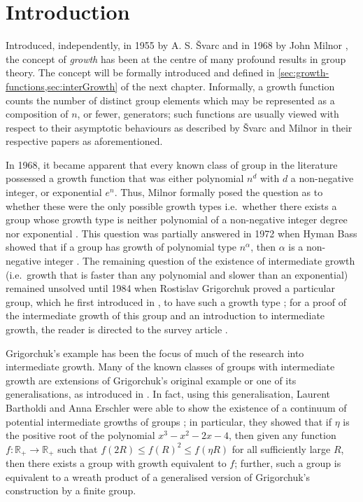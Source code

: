 \chapter{Introduction}

Introduced, independently, in 1955 by A. S. \v{S}varc  %
\cite{SvarcEquivClass} and in 1968 by John Milnor \cite{MilnorEquivClass}, the concept of \emph{growth} has been at the centre of many profound results in group theory.
The concept will be formally introduced and defined in \cref{sec:growth-functions,sec:interGrowth} of the next chapter.
Informally, a growth function counts the number of distinct group elements which may be represented as a composition of $n$, or fewer, generators; such functions are usually viewed with respect to their asymptotic behaviours as described by \v{S}varc and Milnor in their respective papers as aforementioned.

In 1968, it became apparent that every known class of group in the literature possessed a growth function that was either polynomial $n^d$ with $d$ a non-negative integer, or exponential $e^n$.
Thus, Milnor formally posed the question as to whether these were the only possible growth types i.e.\ whether there exists a group whose growth type is neither polynomial of a non-negative integer degree nor exponential \cite{Milnor1968}.
This question was partially answered in 1972 when Hyman Bass showed that if a group has growth of polynomial type $n^\alpha$, then $\alpha$ is a non-negative integer \cite{PolynomialDegree}.
The remaining question of the existence of intermediate growth (i.e.\ growth that is faster than any polynomial and slower than an exponential) remained unsolved until 1984 when Rostislav Grigorchuk proved a particular group, which he first introduced in \cite{GrigFirst}, to have such a growth type \cite{GrigInterm}; for a proof of the intermediate growth of this group and an introduction to intermediate growth, the reader is directed to the survey article \cite{GrigPak}.

Grigorchuk's example  has been the focus of much of the research into intermediate growth.
Many of the known classes of groups with intermediate growth are extensions of Grigorchuk's original example or one of its generalisations, as introduced in \cite{GrigInterm}.
In fact, using this generalisation, Laurent Bartholdi and Anna Erschler were able to show the existence of a continuum of potential intermediate growths of groups \cite{PossibleIntermGrowth}; in particular, they showed that if $\eta$ is the positive root of the polynomial $x^3 - x^2 -2x - 4$, then given any function $f : \mathbb{R}_+ \to \mathbb{R}_+$ such that $f(2R) \leq f(R)^2 \leq f(\eta R)$ for all sufficiently large $R$, then there exists a group with growth equivalent to $f$;
further, such a group is equivalent to a wreath product of a generalised version of Grigorchuk's construction by a finite group.

